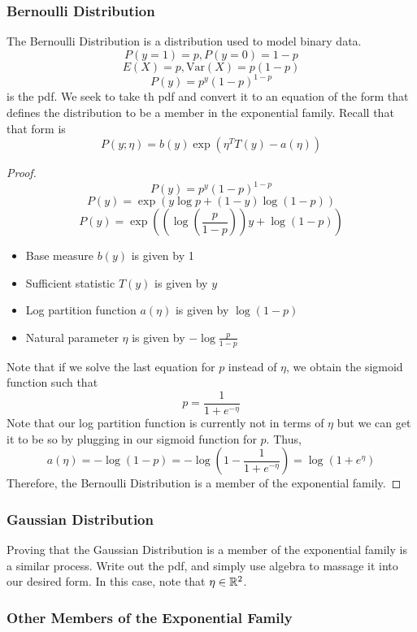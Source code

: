 \documentclass[12pt]{scrartcl}
\begin{document}
\subsubsection{Bernoulli Distribution}

The Bernoulli Distribution is a distribution used to model binary data.
\[P(y = 1) = p, P(y = 0) = 1 - p\]
\[E(X) = p, \text{Var}(X) = p(1-p)\]
\[P(y) = p^y(1-p)^{1-p}\]
is the pdf. We seek to take th pdf and convert it to an equation of the form that defines the distribution to be a member in the exponential family. Recall that that form is 
\[P(y; \eta) = b(y)\exp(\eta^TT(y) - a(\eta))\]
\begin{proof}
\[P(y) = p^y(1-p)^{1-p}\]
\[P(y) = \exp(y\log p + (1-y)\log(1-p))\]
\[P(y) = \exp((\log(\frac{p}{1-p}))y + \log(1-p))\]
\begin{itemize}
    \item Base measure $b(y)$ is given by 1
    \item Sufficient statistic $T(y)$ is given by $y$
    \item Log partition function $a(\eta)$ is given by $\log (1-p)$
    \item Natural parameter $\eta$ is given by $-\log \frac{p}{1-p}$
\end{itemize}
Note that if we solve the last equation for $p$ instead of $\eta$, we obtain the sigmoid function such that 
\[p = \frac{1}{1 + e^{-\eta}}\]
Note that our log partition function is currently not in terms of $\eta$ but we can get it to be so by plugging in our sigmoid function for $p$. Thus, 
\[a(\eta) = -\log(1-p) = -\log(1-\frac{1}{1 + e^{-\eta}}) = \log(1+ e^\eta)\]
Therefore, the Bernoulli Distribution is a member of the exponential family.
\end{proof}

\subsubsection{Gaussian Distribution}

Proving that the Gaussian Distribution is a member of the exponential family is a similar process. Write out the pdf, and simply use algebra to massage it into our desired form. In this case, note that $\eta \in \mathbb R^2$.

\subsubsection{Other Members of the Exponential Family}
\end{document}
